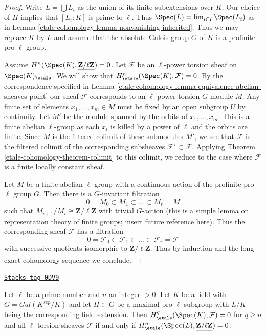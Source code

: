 \begin{proof}
Write $L = \bigcup L_i$ as the union of its finite subextensions over $K$.
Our choice of $H$ implies that $[L_i : K]$ is prime to $\ell$.
Thus $\Spec(L) = \lim_{i \in I} \Spec(L_i)$ as in
Lemma \ref{etale-cohomology-lemma-nonvanishing-inherited}.
Thus we may replace $K$ by $L$ and assume that
the absolute Galois group $G$ of $K$ is a
profinite pro-$\ell$ group.

\medskip\noindent
Assume $H^n(\Spec(K), \underline{\mathbf{Z}/\ell\mathbf{Z}}) = 0$.
Let $\mathcal{F}$ be an $\ell$-power torsion sheaf on $\Spec(K)_\etale$.
We will show that $H^n_\etale(\Spec(K), \mathcal{F}) = 0$.
By the correspondence specified in
Lemma \ref{etale-cohomology-lemma-equivalence-abelian-sheaves-point}
our sheaf $\mathcal{F}$ corresponds to an $\ell$-power torsion
$G$-module $M$. Any finite set of elements $x_1, \ldots, x_m \in M$
must be fixed by an open subgroup $U$ by continuity.
Let $M'$ be the module spanned by the orbits of $x_1, \ldots, x_m$.
This is a finite abelian $\ell$-group
as each $x_i$ is killed by a power of $\ell$
and the orbits are finite. Since $M$ is the filtered colimit of
these submodules $M'$, we see that $\mathcal{F}$ is the filtered
colimit of the corresponding subsheaves $\mathcal{F}' \subset \mathcal{F}$.
Applying Theorem \ref{etale-cohomology-theorem-colimit} to this colimit, we reduce
to the case where $\mathcal{F}$ is a finite locally constant sheaf.

\medskip\noindent
Let $M$ be a finite abelian $\ell$-group with a continuous action
of the profinite pro-$\ell$ group $G$. Then there is a $G$-invariant
filtration
$$
0 = M_0 \subset M_1 \subset \ldots \subset M_r = M
$$
such that $M_{i + 1}/M_i \cong \mathbf{Z}/\ell \mathbf{Z}$ with
trivial $G$-action (this is a simple lemma on representation
theory of finite groups; insert future reference here).
Thus the corresponding sheaf $\mathcal{F}$ has a filtration
$$
0 = \mathcal{F}_0 \subset \mathcal{F}_1 \subset \ldots \subset
\mathcal{F}_r = \mathcal{F}
$$
with successive quotients isomorphic to
$\underline{\mathbf{Z}/\ell \mathbf{Z}}$.
Thus by induction and the long exact cohomology
sequence we conclude.
\end{proof}

\begin{lemma}
\label{etale-cohomology-lemma-reduce-to-l-group-higher}
\href{https://stacks.math.columbia.edu/tag/0DV9}{\texttt{Stacks tag 0DV9}}

Let $\ell$ be a prime number and $n$ an integer $> 0$.
Let $K$ be a field with $G = Gal(K^{sep}/K)$ and let
$H \subset G$ be a maximal pro-$\ell$ subgroup
with $L/K$ being the corresponding field extension.
Then $H^q_\etale(\Spec(K),\mathcal{F}) = 0$ for $q \geq n$ and all
$\ell$-torsion sheaves $\mathcal{F}$ if  and only if
$H^n_\etale(\Spec(L), \underline{\mathbf{Z}/\ell\mathbf{Z}}) = 0$.
\end{lemma}

